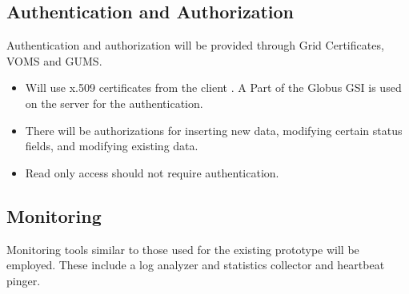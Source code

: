 \documentclass{cmspaper}
\begin{document}
   \subsection{Authentication and Authorization}
Authentication and authorization will be provided through Grid Certificates, VOMS and GUMS.
\begin{itemize}
      \item Will use x.509 certificates from the client . A Part of the Globus GSI is used on the server for the authentication.
      \item There will be authorizations for inserting new data, modifying certain status fields, and modifying existing data.
      \item Read only access should not require authentication.
\end{itemize}
   \subsection{Monitoring}
  Monitoring tools similar to those used for the existing prototype will be employed. These include a log analyzer and statistics collector and heartbeat pinger. 
\end{document}
